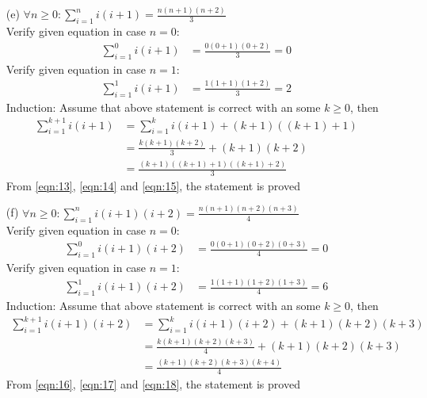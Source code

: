 \begin{enumerate}
    \newpage
    \item[(e)] $\forall n\geq 0: \displaystyle\sum^{n}_{i=1} i(i+1) = \frac{n(n+1)(n+2)}{3}$ \\
        Verify given equation in case $n=0$:
            \begin{align}
                \displaystyle\sum^{0}_{i=1} i(i+1) &= \frac{0(0+1)(0+2)}{3} = 0 \label{eqn:13}
            \end{align}
        Verify given equation in case $n=1$:
            \begin{align}
                \displaystyle\sum^{1}_{i=1} i(i+1) &= \frac{1(1+1)(1+2)}{3} = 2 \label{eqn:14}
            \end{align}
        Induction: Assume that above statement is correct with an some $k \geq 0$, then\\
        \begin{align}
            \displaystyle\sum^{k+1}_{i=1} i(i+1) &= \displaystyle\sum^{k}_{i=1} i(i+1) + (k+1)((k+1)+1) \\
                                            &= \frac{k(k+1)(k+2)}{3} + (k+1)(k+2) \\
                                            &= \frac{(k+1)((k+1)+1)((k+1)+2)}{3} \label{eqn:15}
        \end{align}
        From \ref{eqn:13}, \ref{eqn:14} and \ref{eqn:15}, the statement is proved
    
    \item[(f)] $\forall n\geq 0: \displaystyle\sum^{n}_{i=1} i(i+1)(i+2) = \frac{n(n+1)(n+2)(n+3)}{4}$ \\
        Verify given equation in case $n=0$:
            \begin{align}
                \displaystyle\sum^{0}_{i=1} i(i+1)(i+2) &= \frac{0(0+1)(0+2)(0+3)}{4} = 0 \label{eqn:16}
            \end{align}
        Verify given equation in case $n=1$:
            \begin{align}
                \displaystyle\sum^{1}_{i=1} i(i+1)(i+2) &= \frac{1(1+1)(1+2)(1+3)}{4} = 6 \label{eqn:17}
            \end{align}
        Induction: Assume that above statement is correct with an some $k \geq 0$, then\\
        \begin{align}
            \displaystyle\sum^{k+1}_{i=1} i(i+1)(i+2) &= \displaystyle\sum^{k}_{i=1} i(i+1)(i+2) + (k+1)(k+2)(k+3) \\
                                            &= \frac{k(k+1)(k+2)(k+3)}{4} + (k+1)(k+2)(k+3) \\
                                            &= \frac{(k+1)(k+2)(k+3)(k+4)}{4} \label{eqn:18}
        \end{align}
        From \ref{eqn:16}, \ref{eqn:17} and \ref{eqn:18}, the statement is proved
    

\end{enumerate}
